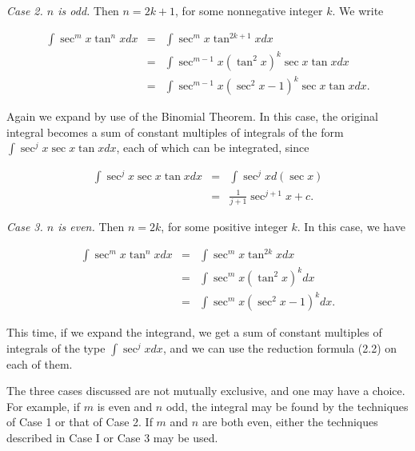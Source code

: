 \textit{Case 2. $n$ is odd.} Then $n = 2k + 1$, for some nonnegative integer $k$. We write
 
\begin{eqnarray*}
\int \sec^{m}x \tan^{n} x dx &=& \int \sec^{m}x \tan^{2k+1}x dx  \\
&=& \int \sec^{m - 1}x (\tan^{2}x)^{k} \sec x \tan x dx \\
&=& \int \sec^{m - 1}x (\sec^{2}x - 1)^{k} \sec x \tan x dx.
\end{eqnarray*}

\noindent Again we expand by use of the Binomial Theorem. In this case, the original integral becomes a sum of constant multiples of integrals of the form $\int \sec^{j}x \sec x \tan x dx$, each of which can be integrated, since

\begin{eqnarray*}
\int \sec^{j}x \sec x \tan x dx &=& \int \sec^{j}x d(\sec x)\\
&=& \frac{1}{ j + 1} \sec^{j+1} x + c.
\end{eqnarray*}

\textit{Case 3. $n$ is even.} Then $n = 2k$, for some positive integer $k$. In this case, we have

\begin{eqnarray*}
\int \sec^{m} x \tan^{n} xdx &=& \int \sec^{m}x \tan^{2k}x dx\\
&=& \int \sec^{m}x (\tan^{2}x)^{k}dx \\
&=& \int \sec^{m}x (\sec^{2}x - 1)^{k} dx.
\end{eqnarray*}

\noindent This time, if we expand the integrand, we get a sum of constant multiples of integrals of the type $\int \sec^{j}x dx$, and we can use the reduction formula (2.2) on each of them.

The three cases discussed are not mutually exclusive, and one may have a choice. 
For example, if $m$ is even and $n$ odd, the integral may be found by the techniques of 
Case 1 or that of Case 2. If $m$ and $n$ are both even, either the techniques described 
in Case I or Case 3 may be used.

